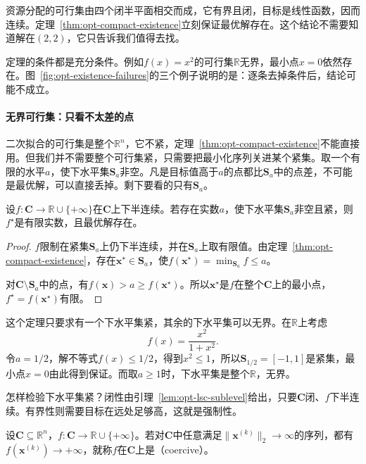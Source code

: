 资源分配的可行集由四个闭半平面相交而成，它有界且闭，目标是线性函数，因而连续。定理~\ref{thm:opt-compact-existence}立刻保证最优解存在。这个结论不需要知道解在$(2,2)$，它只告诉我们值得去找。

定理的条件都是充分条件。例如$f(x)=x^2$的可行集$\mathbb{R}$无界，最小点$x=0$依然存在。图~\ref{fig:opt-existence-failures}的三个例子说明的是：逐条去掉条件后，结论可能不成立。

\paragraph{无界可行集：只看不太差的点}
二次拟合的可行集是整个$\mathbb{R}^n$，它不紧，定理~\ref{thm:opt-compact-existence}不能直接用。但我们并不需要整个可行集紧，只需要把最小化序列关进某个紧集。取一个有限的水平$a$，使下水平集$\bm{S}_a$非空。凡是目标值高于$a$的点都比$\bm{S}_a$中的点差，不可能是最优解，可以直接丢掉。剩下要看的只有$\bm{S}_a$。

\begin{theorem}[紧下水平集保证存在]
\label{thm:opt-compact-sublevel}
设$f:\bm{C}\to\mathbb{R}\cup\{+\infty\}$在$\bm{C}$上下半连续。若存在实数$a$，使下水平集$\bm{S}_a$非空且紧，则$f^\star$是有限实数，且最优解存在。
\end{theorem}

\begin{proof}
$f$限制在紧集$\bm{S}_a$上仍下半连续，并在$\bm{S}_a$上取有限值。由定理~\ref{thm:opt-compact-existence}，存在$\bm{x}^\star\in\bm{S}_a$，使$f(\bm{x}^\star)=\min_{\bm{S}_a}f\leq a$。

对$\bm{C}\setminus\bm{S}_a$中的点，有$f(\bm{x})>a\geq f(\bm{x}^\star)$。所以$\bm{x}^\star$是$f$在整个$\bm{C}$上的最小点，$f^\star=f(\bm{x}^\star)$有限。
\end{proof}

这个定理只要求有一个下水平集紧，其余的下水平集可以无界。在$\mathbb{R}$上考虑
\[
 f(x)=\frac{x^2}{1+x^2}.
\]
令$a=1/2$，解不等式$f(x)\leq1/2$，得到$x^2\leq1$，所以$\bm{S}_{1/2}=[-1,1]$是紧集，最小点$x=0$由此得到保证。而取$a\geq1$时，下水平集是整个$\mathbb{R}$，无界。

怎样检验下水平集紧？闭性由引理~\ref{lem:opt-lsc-sublevel}给出，只要$\bm{C}$闭、$f$下半连续。有界性则需要目标在远处足够高，这就是强制性。

\begin{definition}[强制性]
\label{def:opt-coercive}
设$\bm{C}\subseteq\mathbb{R}^n$，$f:\bm{C}\to\mathbb{R}\cup\{+\infty\}$。若对$\bm{C}$中任意满足$\lVert\bm{x}^{(k)}\rVert_2\to\infty$的序列，都有$f(\bm{x}^{(k)})\to+\infty$，就称$f$在$\bm{C}$上是（coercive）。
\end{definition}

